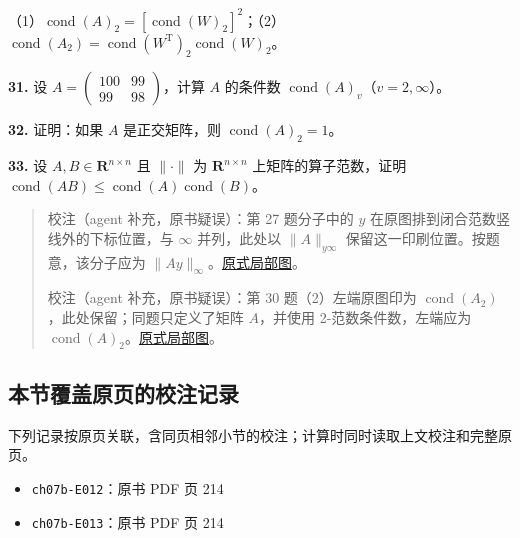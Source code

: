 \documentclass[
  10pt,
  fontset=fandol]{ctexart}
\providecommand{\tightlist}{%
  \setlength{\itemsep}{0pt}\setlength{\parskip}{0pt}}
\begin{document}
（1）\(\operatorname{cond}(A)_2=[\operatorname{cond}(W)_2]^2\)；（2）\(\operatorname{cond}(A_2)=\operatorname{cond}(W^{\mathrm T})_2\operatorname{cond}(W)_2\)。

\textbf{31.} 设 \(A=\begin{pmatrix}100&99\\99&98\end{pmatrix}\)，计算 \(A\) 的条件数 \(\operatorname{cond}(A)_v\)（\(v=2,\infty\)）。

\textbf{32.} 证明：如果 \(A\) 是正交矩阵，则 \(\operatorname{cond}(A)_2=1\)。

\textbf{33.} 设 \(A,B\in\mathbf R^{n\times n}\) 且 \(\|\cdot\|\) 为 \(\mathbf R^{n\times n}\) 上矩阵的算子范数，证明 \(\operatorname{cond}(AB)\leqslant\operatorname{cond}(A)\operatorname{cond}(B)\)。

\begin{quote}
校注（agent 补充，原书疑误）：第 27 题分子中的 \(y\) 在原图排到闭合范数竖线外的下标位置，与 \(\infty\) 并列，此处以 \(\|A\|_{y\infty}\) 保留这一印刷位置。按题意，该分子应为 \(\|Ay\|_\infty\)。\href{../assets/ch07b/214-ex27.png}{原式局部图}。

校注（agent 补充，原书疑误）：第 30 题（2）左端原图印为 \(\operatorname{cond}(A_2)\)，此处保留；同题只定义了矩阵 \(A\)，并使用 2-范数条件数，左端应为 \(\operatorname{cond}(A)_2\)。\href{../assets/ch07b/214-ex30.png}{原式局部图}。
\end{quote}

\subsection{本节覆盖原页的校注记录}\label{ux672cux8282ux8986ux76d6ux539fux9875ux7684ux6821ux6ce8ux8bb0ux5f55}

下列记录按原页关联，含同页相邻小节的校注；计算时同时读取上文校注和完整原页。

\begin{itemize}
\tightlist
\item
  \texttt{ch07b-E012}：原书 PDF 页 214
\item
  \texttt{ch07b-E013}：原书 PDF 页 214
\end{itemize}
\end{document}
